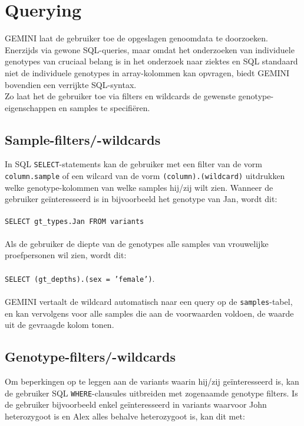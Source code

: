 \section{Querying}

GEMINI laat de gebruiker toe de opgeslagen genoomdata te doorzoeken. Enerzijds via gewone SQL-queries, maar omdat het onderzoeken van individuele genotypes van cruciaal belang is in het onderzoek naar ziektes en SQL standaard niet de individuele genotypes in array-kolommen kan opvragen, biedt GEMINI bovendien een verrijkte SQL-syntax.\\
Zo laat het de gebruiker toe via filters en wildcards de gewenste genotype-eigenschappen en samples te specifi\"eren.

\subsection{Sample-filters/-wildcards} 
In SQL \texttt{SELECT}-statements kan de gebruiker met een filter van de vorm \texttt{column.sample} of een wilcard van de vorm \texttt{(column).(wildcard)} uitdrukken welke genotype-kolommen van welke samples hij/zij wilt zien. Wanneer de gebruiker ge\"interesseerd is in bijvoorbeeld het genotype van Jan, wordt dit:\\\\
\texttt{SELECT gt\_types.Jan FROM variants}\\\\
Als de gebruiker de diepte van de genotypes alle samples van vrouwelijke proefpersonen wil zien, wordt dit:\\\\
\texttt{SELECT (gt\_depths).(sex = 'female')}.\\\\
GEMINI vertaalt de wildcard automatisch naar een query op de \texttt{samples}-tabel, en kan vervolgens voor alle samples die aan de voorwaarden voldoen, de waarde uit de gevraagde kolom tonen.

\subsection{Genotype-filters/-wildcards}
Om beperkingen op te leggen aan de variants waarin hij/zij ge\"interesseerd is, kan de gebruiker SQL \texttt{WHERE}-clausules uitbreiden met zogenaamde genotype filters. Is de gebruiker bijvoorbeeld enkel ge\"interesseerd in variants waarvoor John heterozygoot is en Alex alles behalve heterozygoot is, kan dit met:\\

